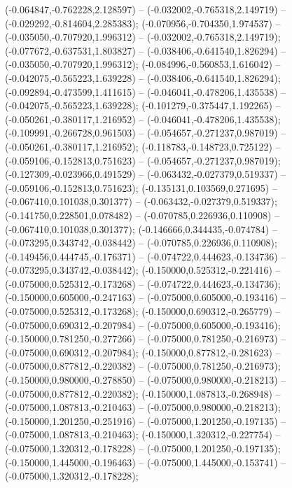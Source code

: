  (-0.064847,-0.762228,2.128597) -- (-0.032002,-0.765318,2.149719) -- (-0.029292,-0.814604,2.285383);
 (-0.070956,-0.704350,1.974537) -- (-0.035050,-0.707920,1.996312) -- (-0.032002,-0.765318,2.149719);
 (-0.077672,-0.637531,1.803827) -- (-0.038406,-0.641540,1.826294) -- (-0.035050,-0.707920,1.996312);
 (-0.084996,-0.560853,1.616042) -- (-0.042075,-0.565223,1.639228) -- (-0.038406,-0.641540,1.826294);
 (-0.092894,-0.473599,1.411615) -- (-0.046041,-0.478206,1.435538) -- (-0.042075,-0.565223,1.639228);
 (-0.101279,-0.375447,1.192265) -- (-0.050261,-0.380117,1.216952) -- (-0.046041,-0.478206,1.435538);
 (-0.109991,-0.266728,0.961503) -- (-0.054657,-0.271237,0.987019) -- (-0.050261,-0.380117,1.216952);
 (-0.118783,-0.148723,0.725122) -- (-0.059106,-0.152813,0.751623) -- (-0.054657,-0.271237,0.987019);
 (-0.127309,-0.023966,0.491529) -- (-0.063432,-0.027379,0.519337) -- (-0.059106,-0.152813,0.751623);
 (-0.135131,0.103569,0.271695) -- (-0.067410,0.101038,0.301377) -- (-0.063432,-0.027379,0.519337);
 (-0.141750,0.228501,0.078482) -- (-0.070785,0.226936,0.110908) -- (-0.067410,0.101038,0.301377);
 (-0.146666,0.344435,-0.074784) -- (-0.073295,0.343742,-0.038442) -- (-0.070785,0.226936,0.110908);
 (-0.149456,0.444745,-0.176371) -- (-0.074722,0.444623,-0.134736) -- (-0.073295,0.343742,-0.038442);
 (-0.150000,0.525312,-0.221416) -- (-0.075000,0.525312,-0.173268) -- (-0.074722,0.444623,-0.134736);
 (-0.150000,0.605000,-0.247163) -- (-0.075000,0.605000,-0.193416) -- (-0.075000,0.525312,-0.173268);
 (-0.150000,0.690312,-0.265779) -- (-0.075000,0.690312,-0.207984) -- (-0.075000,0.605000,-0.193416);
 (-0.150000,0.781250,-0.277266) -- (-0.075000,0.781250,-0.216973) -- (-0.075000,0.690312,-0.207984);
 (-0.150000,0.877812,-0.281623) -- (-0.075000,0.877812,-0.220382) -- (-0.075000,0.781250,-0.216973);
 (-0.150000,0.980000,-0.278850) -- (-0.075000,0.980000,-0.218213) -- (-0.075000,0.877812,-0.220382);
 (-0.150000,1.087813,-0.268948) -- (-0.075000,1.087813,-0.210463) -- (-0.075000,0.980000,-0.218213);
 (-0.150000,1.201250,-0.251916) -- (-0.075000,1.201250,-0.197135) -- (-0.075000,1.087813,-0.210463);
 (-0.150000,1.320312,-0.227754) -- (-0.075000,1.320312,-0.178228) -- (-0.075000,1.201250,-0.197135);
 (-0.150000,1.445000,-0.196463) -- (-0.075000,1.445000,-0.153741) -- (-0.075000,1.320312,-0.178228);

